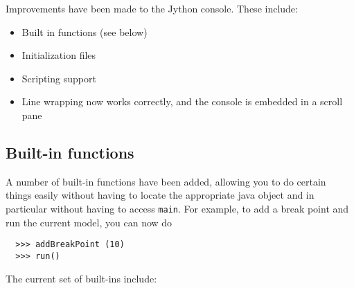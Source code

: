 \documentclass{article}
\begin{document}
Improvements have been made to the Jython console. These include:

\begin{itemize}

\item Built in functions (see below)
\item Initialization files
\item Scripting support
\item Line wrapping now works correctly, and the console is embedded in a scroll
pane

\end{itemize}

\subsection*{Built-in functions}

A number of built-in functions have been added, allowing you to do
certain things easily without having to locate the appropriate java
object and in particular without having to access {\tt main}. For
example, to add a break point and run the current model, you can now
do

\begin{verbatim}
  >>> addBreakPoint (10)
  >>> run()
\end{verbatim}

The current set of built-ins include:
\end{document}
